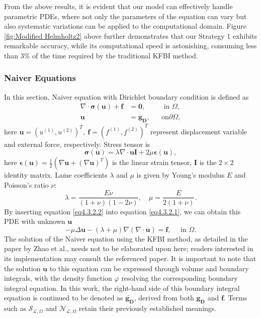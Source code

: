\documentclass{article}
\begin{document}
From the above results, it is evident that our model can effectively handle parametric PDEs, where not only the parameters of the equation can vary but also systematic variations can be applied to the computational domain. Figure \ref{fig:Modified Helmholtz2} above further demonstrates that our Strategy 1 exhibits remarkable accuracy, while its computational speed is astonishing, consuming less than $3\%$ of the time required by the traditional KFBI method.

\subsubsection{Naiver Equations} \label{Naiver Equations}
In this section, Naiver equation with Dirichlet boundary condition is defined as
\begin{equation} \label{eq4.3.2.1}
\begin{aligned}
\nabla \cdot \boldsymbol{\sigma}(\mathbf{u})+\mathbf{f} & =\mathbf{0}, & & \text { in } \Omega, \\
\mathbf{u} & =\mathbf{g_D}, & & \text {on} \partial \Omega,
\end{aligned}
\end{equation}
here $\mathbf{u}=\left(u^{(1)}, u^{(2)}\right)^T,\ \mathbf{f}=\left(f^{(1)}, f^{(2)}\right)^T$ represent displacement variable and external force, respectively. Stress tensor is
\begin{equation} \label{eq4.3.2.2}
\boldsymbol{\sigma}(\mathbf{u})=\lambda \nabla \cdot \mathbf{u} \mathbf{I}+2 \mu \boldsymbol{\epsilon}(\mathbf{u}),
\end{equation}
here $\boldsymbol{\epsilon}(\mathbf{u})=\frac{1}{2}\left(\nabla \mathbf{u}+(\nabla \mathbf{u})^T\right)$ is the linear strain tensor, $\mathbf{I}$ is the $2 \times 2$ identity matrix. La$\acute{\mbox{m}}$e coefficients $\lambda$ and $\mu$ is given by Young's modulus $E$ and Poisson's ratio $\nu$:
\begin{equation*}
\lambda=\frac{E \nu}{(1+\nu)(1-2 \nu)}, \quad \mu=\frac{E}{2(1+\nu)}.
\end{equation*}
By inserting equation \eqref{eq4.3.2.2} into equation \eqref{eq4.3.2.1}, we can obtain this PDE with unknown $\mathbf{u}$
\begin{equation} \label{eq4.3.2.3}
-\mu \Delta \mathbf{u}-(\lambda+\mu) \nabla(\nabla \cdot \mathbf{u})=\mathbf{f}, \quad \text { in } \Omega .
\end{equation}
The solution of the Naiver equation using the KFBI method, as detailed in the paper by Zhao et al.\cite{zhao2023kernel}, needs not to be elaborated upon here; readers interested in its implementation may consult the referenced paper. It is important to note that the solution $\mathbf{u}$ to this equation can be expressed through volume and boundary integrals, with the density function $\varphi$ resolving the corresponding boundary integral equation. In this work, the right-hand side of this boundary integral equation is continued to be denoted as $\widetilde{\mathbf{g_D}}$, derived from both $\mathbf{g_D}$ and $\mathbf{f}$. Terms such as $\mathcal{S}_{\mathcal{L}, \Omega}$ and $\mathcal{N}_{\mathcal{L}, \Omega}$ retain their previously established meanings.
\end{document}
